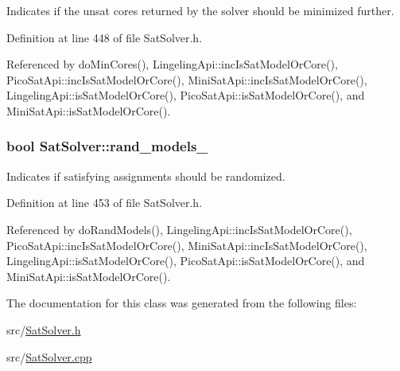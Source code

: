 Indicates if the unsat cores returned by the solver should be minimized further. 



Definition at line 448 of file Sat\-Solver.\-h.



Referenced by do\-Min\-Cores(), Lingeling\-Api\-::inc\-Is\-Sat\-Model\-Or\-Core(), Pico\-Sat\-Api\-::inc\-Is\-Sat\-Model\-Or\-Core(), Mini\-Sat\-Api\-::inc\-Is\-Sat\-Model\-Or\-Core(), Lingeling\-Api\-::is\-Sat\-Model\-Or\-Core(), Pico\-Sat\-Api\-::is\-Sat\-Model\-Or\-Core(), and Mini\-Sat\-Api\-::is\-Sat\-Model\-Or\-Core().

\hypertarget{classSatSolver_a73fed24d8fb4da85ef82dc53ac5f28c7}{
\subsubsection[{rand\-\_\-models\-\_\-}]{\setlength{\rightskip}{0pt plus 5cm}bool Sat\-Solver\-::rand\-\_\-models\-\_\-\hspace{0.3cm}{\ttfamily [protected]}}}\label{classSatSolver_a73fed24d8fb4da85ef82dc53ac5f28c7}


Indicates if satisfying assignments should be randomized. 



Definition at line 453 of file Sat\-Solver.\-h.



Referenced by do\-Rand\-Models(), Lingeling\-Api\-::inc\-Is\-Sat\-Model\-Or\-Core(), Pico\-Sat\-Api\-::inc\-Is\-Sat\-Model\-Or\-Core(), Mini\-Sat\-Api\-::inc\-Is\-Sat\-Model\-Or\-Core(), Lingeling\-Api\-::is\-Sat\-Model\-Or\-Core(), Pico\-Sat\-Api\-::is\-Sat\-Model\-Or\-Core(), and Mini\-Sat\-Api\-::is\-Sat\-Model\-Or\-Core().



The documentation for this class was generated from the following files\-:\begin{DoxyCompactItemize}
\item 
src/\hyperlink{SatSolver_8h}{Sat\-Solver.\-h}\item 
src/\hyperlink{SatSolver_8cpp}{Sat\-Solver.\-cpp}\end{DoxyCompactItemize}
